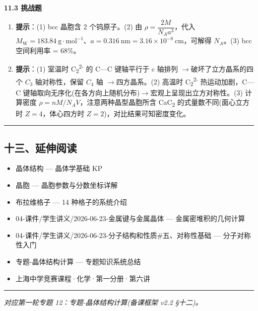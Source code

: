 \documentclass[a4paper,11pt]{ctexart}
\providecommand{\tightlist}{\setlength{\itemsep}{0pt}\setlength{\parskip}{0pt}}
\newcommand{\箭}{\ensuremath{\rightarrow}}
\newcommand{\左箭}{\ensuremath{\leftarrow}}
\newcommand{\上箭}{\ensuremath{\uparrow}}
\newcommand{\下箭}{\ensuremath{\downarrow}}
\newcommand{\衡}{\ensuremath{\rightleftharpoons}}
\newcommand{\双箭}{\ensuremath{\leftrightarrow}}
\newcommand{\约等于}{\ensuremath{\approx}}
\newcommand{\小于等于}{\ensuremath{\leq}}
\newcommand{\大于等于}{\ensuremath{\geq}}
\newcommand{\不等于}{\ensuremath{\neq}}
\newcommand{\西格马}{\ensuremath{\sigma}}
\newcommand{\派}{\ensuremath{\pi}}
\begin{document}
\textbf{11.3 挑战题}

\begin{enumerate}
\def\labelenumi{\arabic{enumi}.}
\setcounter{enumi}{6}
\item
  \textbf{提示}：(1) bcc 晶胞含 2 个钨原子。(2) 由 \(\rho = \dfrac{2M}{N_A a^3}\)，代入 \(M_{\mathrm{W}} = 183.84\ \mathrm{g\cdot mol^{-1}}\)、\(a = 0.316\ \mathrm{nm} = 3.16\times 10^{-8}\ \mathrm{cm}\)，可解得 \(N_A\)。(3) bcc 空间利用率 = 68\%。
\item
  \textbf{提示}：(1) 室温时 C\textsubscript{2}\textsuperscript{2-} 的 C---C 键轴平行于 c 轴排列 \箭 破坏了立方晶系的四个 \(C_3\) 轴对称性，保留 \(C_4\) 轴 \箭 四方晶系。(2) 高温时 C\textsubscript{2}\textsuperscript{2-} 热运动加剧，C---C 键轴取向无序化(在各方向上随机分布)\箭 宏观上呈现出立方对称性。(3) 计算密度 \(\rho = nM/N_A V\)，注意两种晶型晶胞所含 CaC\textsubscript{2} 的式量数不同(面心立方时 \(Z = 4\)，体心四方时 \(Z = 2\))，对比结果可知密度变化。
\end{enumerate}

\begin{center}\rule{0.5\linewidth}{0.5pt}\end{center}

\subsection{十三、延伸阅读}\label{ux5341ux4e09ux5ef6ux4f38ux9605ux8bfb}

\begin{itemize}
\tightlist
\item
  晶体结构 --- 晶体学基础 KP
\item
  晶胞 --- 晶胞参数与分数坐标详解
\item
  布拉维格子 --- 14 种格子的系统介绍
\item
  04-课件/学生讲义/2026-06-23-金属键与金属晶体 --- 金属密堆积的几何计算
\item
  04-课件/学生讲义/2026-06-23-分子结构和性质\#五、对称性基础 --- 分子对称性入门
\item
  专题-晶体结构计算 --- 专题知识系统总结
\item
  上海中学竞赛课程·化学·第一分册·第六讲
\end{itemize}

\begin{center}\rule{0.5\linewidth}{0.5pt}\end{center}

\emph{对应第一轮专题 12：专题-晶体结构计算(备课框架 v2.2 §十二)。}
\end{document}
